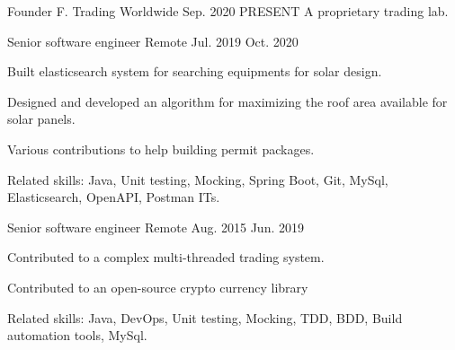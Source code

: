

\begin{cventries}

  \cventry
    {Founder} %
    {F. Trading} %
    {Worldwide} %
    {Sep. 2020 \textemdash{} PRESENT} %
    {
    	A proprietary trading lab.
    }

  \cventry
    {Senior software engineer} %
    {} %
    {Remote} %
    {Jul. 2019 \textemdash{} Oct. 2020} %
    {
      \begin{cvitems}
      \item{Built elasticsearch system for searching equipments for solar design.}
      \item{Designed and developed an algorithm for maximizing the roof area available for solar panels.}
      \item{Various contributions to help building permit packages.}
      \end{cvitems}
      Related skills: Java, Unit testing, Mocking, Spring Boot, Git, MySql, Elasticsearch, OpenAPI, Postman ITs.
    }

  \cventry
    {Senior software engineer} %
    {} %
    {Remote} %
    {Aug. 2015 \textemdash{} Jun. 2019} %
    {
      \begin{cvitems}
      \item{Contributed to a complex multi-threaded trading system.}
      \item{Contributed to an open-source crypto currency library }
      \end{cvitems}
      Related skills: Java, DevOps, Unit testing, Mocking, TDD, BDD, Build automation tools, MySql.
    }


\end{cventries}
